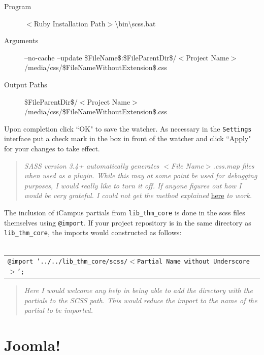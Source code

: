 \documentclass[]{report}
\begin{document}
\begin{description}
	\item[Program] $<$Ruby Installation Path$>$\textbackslash bin\textbackslash scss.bat
	\item[Arguments] --no-cache --update \newline \$FileName\$:\$FileParentDir\$/$<$Project Name$>$/media/css/\$FileNameWithoutExtension\$.css
	\item[Output Paths] \$FileParentDir\$/$<$Project Name$>$/media/css/\$FileNameWithoutExtension\$.css
\end{description}

\noindent
Upon completion click ``OK" to save the watcher. As necessary in the \texttt{Settings} interface put a check mark in the box in front of the watcher and click ``Apply" for your changes to take effect.

\begin{quote}
	\emph{SASS version 3.4+ automatically generates $<$File Name$>$.css.map files when used as a plugin. While this may at some point be used for debugging purposes, I would really like to turn it off. If anyone figures out how I would be very grateful. I could not get the method explained} \href{http://sass-lang.com/documentation/file.SASS\_CHANGELOG.html#341\_22_august\_2014}{here} \emph{to work.}
\end{quote}

\noindent
The inclusion of iCampus partials from \texttt{lib\_thm\_core} is done in the scss files themselves using \texttt{@import}. If your project repository is in the same directory as \texttt{lib\_thm\_core}, the imports would constructed as follows:\\
\\
\begin{tabular}{l}
	\texttt{@import '../../lib\_thm\_core/scss/$<$Partial Name without Underscore$>$';}
\end{tabular}

\begin{quote}
	\emph{Here I would welcome any help in being able to add the directory with the partials to the SCSS path. This would reduce the import to the name of the partial to be imported.}
\end{quote}

\newpage

\section{Joomla!}
\end{document}
